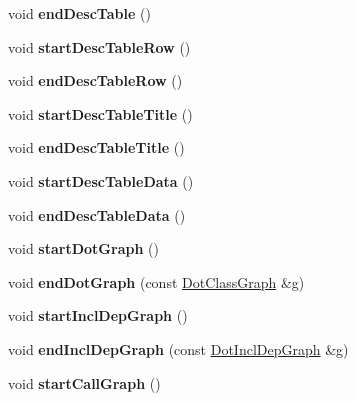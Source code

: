 \begin{DoxyCompactItemize}
void {\bfseries end\+Desc\+Table} ()
\item 
\mbox{\label{class_output_list_af4b472918891fdf268e7f13ccdc4e88a}} 
void {\bfseries start\+Desc\+Table\+Row} ()
\item 
\mbox{\label{class_output_list_a0b3d38267387585eb41163745d8c364f}} 
void {\bfseries end\+Desc\+Table\+Row} ()
\item 
\mbox{\label{class_output_list_a6b984edbfa21eecfe20b2a7a3ef0fc97}} 
void {\bfseries start\+Desc\+Table\+Title} ()
\item 
\mbox{\label{class_output_list_a51b3d439827ec272ecc6e8c2e108eac0}} 
void {\bfseries end\+Desc\+Table\+Title} ()
\item 
\mbox{\label{class_output_list_a8823d3ed58554ae3eeb9169ff920ba00}} 
void {\bfseries start\+Desc\+Table\+Data} ()
\item 
\mbox{\label{class_output_list_a66b7fd1338764cbe47b66d3f9e77bb07}} 
void {\bfseries end\+Desc\+Table\+Data} ()
\item 
\mbox{\label{class_output_list_ac6fc93128d92c79a08995457b10f6e1f}} 
void {\bfseries start\+Dot\+Graph} ()
\item 
\mbox{\label{class_output_list_a039bfcce8dbfff89288b249be62565a7}} 
void {\bfseries end\+Dot\+Graph} (const \mbox{\hyperlink{class_dot_class_graph}{Dot\+Class\+Graph}} \&g)
\item 
\mbox{\label{class_output_list_a1d3ded0121b9163ac3b11c0bb8e380c4}} 
void {\bfseries start\+Incl\+Dep\+Graph} ()
\item 
\mbox{\label{class_output_list_a547e9f9834f73115ccb47ed553f21334}} 
void {\bfseries end\+Incl\+Dep\+Graph} (const \mbox{\hyperlink{class_dot_incl_dep_graph}{Dot\+Incl\+Dep\+Graph}} \&g)
\item 
\mbox{\label{class_output_list_a20837aeac45ccb44d354e42e75eb51c9}} 
void {\bfseries start\+Call\+Graph} ()

\end{DoxyCompactItemize}
